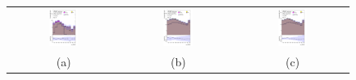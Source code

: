 \begin{figure}[H]
\centering
\begin{tabular}{@{}ccc@{}}
\includegraphics[page=1,width=0.28\textwidth]{figures/mtt/tuH_reg1l2tau1bnj_os_log_mtt.pdf} &
\includegraphics[page=1,width=0.28\textwidth]{figures/mtt/tuH_reg1l1tau1b1j_ss_log_mtt.pdf}&
\includegraphics[page=1,width=0.28\textwidth]{figures/mtt/tuH_reg1l1tau1b2j_ss_log_mtt.pdf}\\
(a) & (b) & (c) \\

\end{tabular}
\end{figure}

